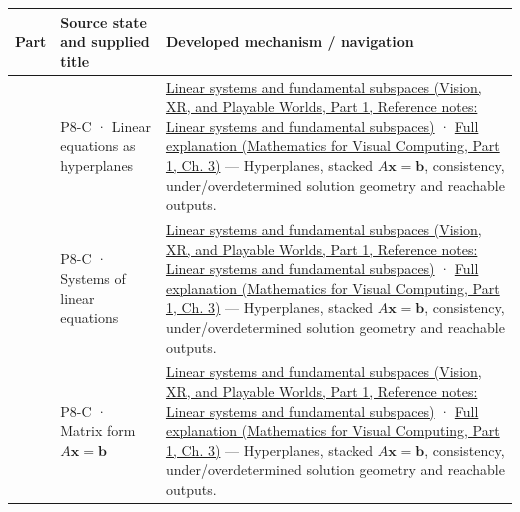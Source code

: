 {\def\LTcaptype{none} %
\begin{longtable}[]{@{}
  >{\raggedright\arraybackslash}p{}
  >{\raggedright\arraybackslash}p{}
  >{\raggedright\arraybackslash}p{}@{}}
\toprule\noalign{}
\begin{minipage}[b]{\linewidth}\raggedright
Part
\end{minipage} & \begin{minipage}[b]{\linewidth}\raggedright
Source state and supplied title
\end{minipage} & \begin{minipage}[b]{\linewidth}\raggedright
Developed mechanism / navigation
\end{minipage} \\
\midrule\noalign{}
\endhead
\bottomrule\noalign{}
\endlastfoot
701 & P8-C · Linear equations as hyperplanes & \href{../07-Vision-XR-and-Playable-Worlds-P01/main.pdf\#nameddest=appendix-8572a4a060c1}{Linear systems and fundamental subspaces (Vision, XR, and Playable Worlds, Part 1, Reference notes: Linear systems and fundamental subspaces)} · \href{../02-Mathematics-for-Visual-Computing-P01/main.pdf\#nameddest=01-foundations-i-ch019-a-system-is-an-intersection-of-constraints}{Full explanation (Mathematics for Visual Computing, Part 1, Ch. 3)} --- Hyperplanes, stacked \(A\mathbf x=\mathbf b\), consistency, under/overdetermined solution geometry and reachable outputs. \\
702 & P8-C · Systems of linear equations & \href{../07-Vision-XR-and-Playable-Worlds-P01/main.pdf\#nameddest=appendix-8572a4a060c1}{Linear systems and fundamental subspaces (Vision, XR, and Playable Worlds, Part 1, Reference notes: Linear systems and fundamental subspaces)} · \href{../02-Mathematics-for-Visual-Computing-P01/main.pdf\#nameddest=01-foundations-i-ch019-a-system-is-an-intersection-of-constraints}{Full explanation (Mathematics for Visual Computing, Part 1, Ch. 3)} --- Hyperplanes, stacked \(A\mathbf x=\mathbf b\), consistency, under/overdetermined solution geometry and reachable outputs. \\
703 & P8-C · Matrix form \(A\mathbf x=\mathbf b\) & \href{../07-Vision-XR-and-Playable-Worlds-P01/main.pdf\#nameddest=appendix-8572a4a060c1}{Linear systems and fundamental subspaces (Vision, XR, and Playable Worlds, Part 1, Reference notes: Linear systems and fundamental subspaces)} · \href{../02-Mathematics-for-Visual-Computing-P01/main.pdf\#nameddest=01-foundations-i-ch019-a-system-is-an-intersection-of-constraints}{Full explanation (Mathematics for Visual Computing, Part 1, Ch. 3)} --- Hyperplanes, stacked \(A\mathbf x=\mathbf b\), consistency, under/overdetermined solution geometry and reachable outputs. \\

\end{longtable}}
